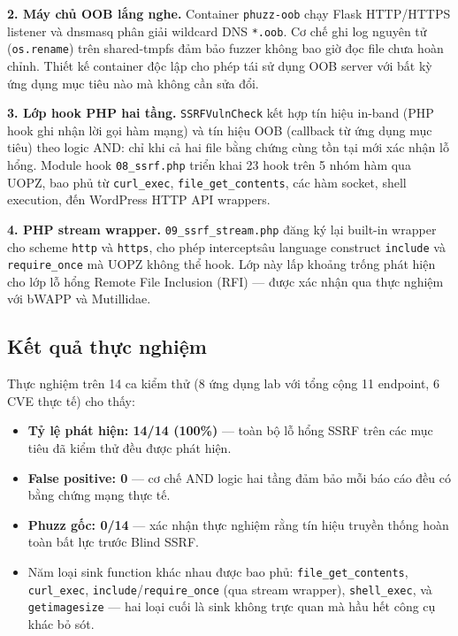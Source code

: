 \textbf{2. Máy chủ OOB lắng nghe.} Container \texttt{phuzz-oob} chạy
Flask HTTP/HTTPS listener và dnsmasq phân giải wildcard DNS
\texttt{*.oob}. Cơ chế ghi log nguyên tử (\texttt{os.rename}) trên
shared-tmpfs đảm bảo fuzzer không bao giờ đọc file chưa hoàn chỉnh.
Thiết kế container độc lập cho phép tái sử dụng OOB server với bất kỳ
ứng dụng mục tiêu nào mà không cần sửa đổi.

\textbf{3. Lớp hook PHP hai tầng.} \texttt{SSRFVulnCheck} kết hợp
tín hiệu in-band (PHP hook ghi nhận lời gọi hàm mạng) và tín hiệu OOB
(callback từ ứng dụng mục tiêu) theo logic AND: chỉ khi cả hai file
bằng chứng cùng tồn tại mới xác nhận lỗ hổng. Module hook
\texttt{08\_ssrf.php} triển khai 23 hook trên 5 nhóm hàm qua UOPZ,
bao phủ từ \texttt{curl\_exec}, \texttt{file\_get\_contents}, các hàm
socket, shell execution, đến WordPress HTTP API wrappers.

\textbf{4. PHP stream wrapper.} \texttt{09\_ssrf\_stream.php} đăng ký
lại built-in wrapper cho scheme \texttt{http} và \texttt{https}, cho
phép interceptsâu language construct \texttt{include} và
\texttt{require\_once} mà UOPZ không thể hook. Lớp này lấp khoảng
trống phát hiện cho lớp lỗ hổng Remote File Inclusion (RFI) --- được
xác nhận qua thực nghiệm với bWAPP và Mutillidae.

\subsection{Kết quả thực nghiệm}

Thực nghiệm trên 14 ca kiểm thử (8 ứng dụng lab với tổng cộng 11
endpoint, 6 CVE thực tế) cho thấy:

\begin{itemize}
    \item \textbf{Tỷ lệ phát hiện: 14/14 (100\%)} --- toàn bộ lỗ hổng
    SSRF trên các mục tiêu đã kiểm thử đều được phát hiện.
    \item \textbf{False positive: 0} --- cơ chế AND logic hai tầng
    đảm bảo mỗi báo cáo đều có bằng chứng mạng thực tế.
    \item \textbf{Phuzz gốc: 0/14} --- xác nhận thực nghiệm rằng tín
    hiệu truyền thống hoàn toàn bất lực trước Blind SSRF.
    \item Năm loại sink function khác nhau được bao phủ:
    \texttt{file\_get\_contents}, \texttt{curl\_exec},
    \texttt{include}/\texttt{require\_once} (qua stream wrapper),
    \texttt{shell\_exec}, và \texttt{getimagesize} --- hai loại cuối là
    sink không trực quan mà hầu hết công cụ khác bỏ sót.
\end{itemize}

